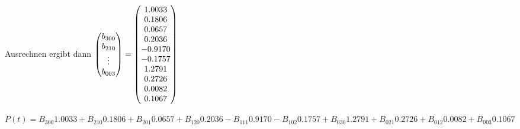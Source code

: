 Ausrechnen ergibt dann
$\left( \begin{matrix}b_{300} \\ b_{210} \\ \vdots \\ b_{003}\end{matrix}\right) =
\left( \begin{matrix}
 1.0033\\
 0.1806\\
 0.0657\\
 0.2036\\
-0.9170\\
-0.1757\\
 1.2791\\
 0.2726\\
 0.0082\\
 0.1067\end{matrix}\right)$
 
 $P(t) = 
 B_{300} 1.0033+
 B_{210} 0.1806+
 B_{201} 0.0657+
 B_{120} 0.2036-
 B_{111}0.9170-
 B_{102}0.1757+
 B_{030} 1.2791+
 B_{021} 0.2726+
 B_{012} 0.0082+
 B_{003} 0.1067$
